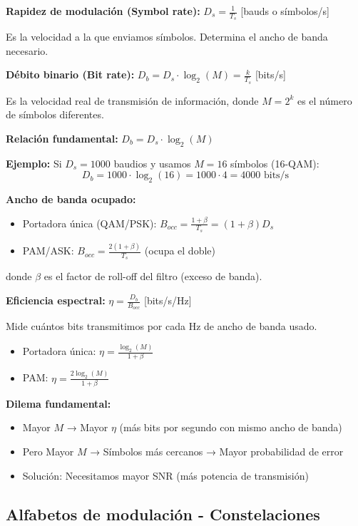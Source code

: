 \documentclass[10pt,a4paper]{article}
\begin{document}
\begin{tcolorbox}[colback=azulclaro!10,colframe=azuloscuro,title=Definiciones clave]
\textbf{Rapidez de modulación (Symbol rate):} $D_s = \frac{1}{T_s}$ [bauds o símbolos/s]

Es la velocidad a la que enviamos símbolos. Determina el ancho de banda necesario.

\textbf{Débito binario (Bit rate):} $D_b = D_s \cdot \log_2(M) = \frac{k}{T_s}$ [bits/s]

Es la velocidad real de transmisión de información, donde $M = 2^k$ es el número de símbolos diferentes.

\textbf{Relación fundamental:} $D_b = D_s \cdot \log_2(M)$

\textbf{Ejemplo:} Si $D_s = 1000$ baudios y usamos $M=16$ símbolos (16-QAM):
$$D_b = 1000 \cdot \log_2(16) = 1000 \cdot 4 = 4000 \text{ bits/s}$$

\textbf{Ancho de banda ocupado:}
\begin{itemize}
\item Portadora única (QAM/PSK): $B_{occ} = \frac{1+\beta}{T_s} = (1+\beta)D_s$
\item PAM/ASK: $B_{occ} = \frac{2(1+\beta)}{T_s}$ (ocupa el doble)
\end{itemize}

donde $\beta$ es el factor de roll-off del filtro (exceso de banda).

\textbf{Eficiencia espectral:} $\eta = \frac{D_b}{B_{occ}}$ [bits/s/Hz]

Mide cuántos bits transmitimos por cada Hz de ancho de banda usado.

\begin{itemize}
\item Portadora única: $\eta = \frac{\log_2(M)}{1+\beta}$
\item PAM: $\eta = \frac{2\log_2(M)}{1+\beta}$
\end{itemize}

\textbf{Dilema fundamental:}
\begin{itemize}
\item Mayor $M$ → Mayor $\eta$ (más bits por segundo con mismo ancho de banda)
\item Pero Mayor $M$ → Símbolos más cercanos → Mayor probabilidad de error
\item Solución: Necesitamos mayor SNR (más potencia de transmisión)
\end{itemize}
\end{tcolorbox}

\subsection{Alfabetos de modulación - Constelaciones}
\end{document}
